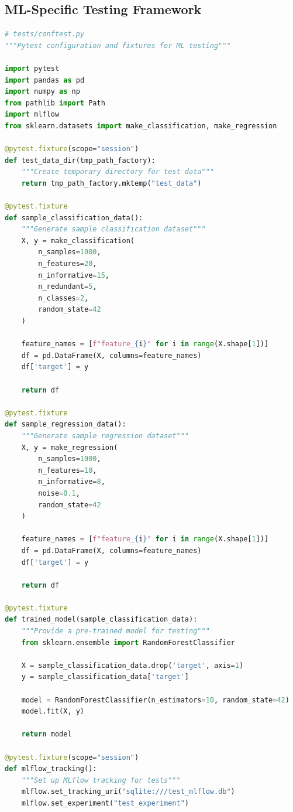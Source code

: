 \subsection{ML-Specific Testing Framework}

\begin{lstlisting}[language=Python, caption=Comprehensive ML Testing Suite]
# tests/conftest.py
"""Pytest configuration and fixtures for ML testing"""

import pytest
import pandas as pd
import numpy as np
from pathlib import Path
import mlflow
from sklearn.datasets import make_classification, make_regression

@pytest.fixture(scope="session")
def test_data_dir(tmp_path_factory):
    """Create temporary directory for test data"""
    return tmp_path_factory.mktemp("test_data")

@pytest.fixture
def sample_classification_data():
    """Generate sample classification dataset"""
    X, y = make_classification(
        n_samples=1000,
        n_features=20,
        n_informative=15,
        n_redundant=5,
        n_classes=2,
        random_state=42
    )

    feature_names = [f"feature_{i}" for i in range(X.shape[1])]
    df = pd.DataFrame(X, columns=feature_names)
    df['target'] = y

    return df

@pytest.fixture
def sample_regression_data():
    """Generate sample regression dataset"""
    X, y = make_regression(
        n_samples=1000,
        n_features=10,
        n_informative=8,
        noise=0.1,
        random_state=42
    )

    feature_names = [f"feature_{i}" for i in range(X.shape[1])]
    df = pd.DataFrame(X, columns=feature_names)
    df['target'] = y

    return df

@pytest.fixture
def trained_model(sample_classification_data):
    """Provide a pre-trained model for testing"""
    from sklearn.ensemble import RandomForestClassifier

    X = sample_classification_data.drop('target', axis=1)
    y = sample_classification_data['target']

    model = RandomForestClassifier(n_estimators=10, random_state=42)
    model.fit(X, y)

    return model

@pytest.fixture(scope="session")
def mlflow_tracking():
    """Set up MLflow tracking for tests"""
    mlflow.set_tracking_uri("sqlite:///test_mlflow.db")
    mlflow.set_experiment("test_experiment")


\end{lstlisting}

